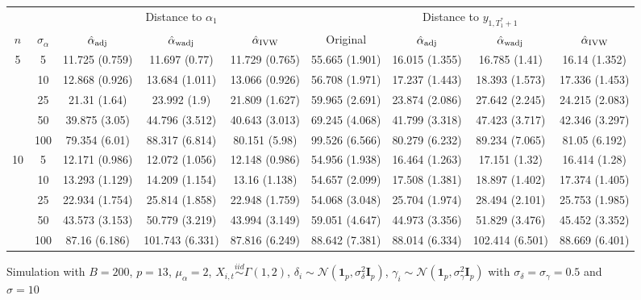 \documentclass[10pt]{article}
\newcommand{\simiid}{\stackrel{iid}{\sim}} %
\def\normal#1#2{\mathcal{N}(#1,#2)} %
\theoremstyle{definition}
\begin{document}

\begin{sidewaysfigure}
\centering
\caption{Simulation  with $B = 200$, $p = 13$, $\mu_{\alpha}=2$, $X_{i,t} \simiid \Gamma(1,2)$, $\delta_i \sim \normal{\mathbf{1}_p}{\sigma^2_{\delta}\mathbf{I}_p}$, $\gamma_i \sim \normal{\mathbf{1}_p}{\sigma^2_{\gamma}\mathbf{I}_p}$ with $\sigma_{\delta}=\sigma_{\gamma}=0.5$ and $\sigma = 10$}
\begin{tabular}{cc|ccc|cccc}
  & & \multicolumn{3}{c|}{Distance to $\alpha_1$}  & \multicolumn{4}{c}{Distance to $y_{1, T_1^*+1}$}  \\ 
  $n$   & $\sigma_{\alpha}$ & $\hat{\alpha}_{\rm adj}$  & $\hat{\alpha}_{\rm wadj}$ & $\hat{\alpha}_{\rm IVW}$ & Original & $\hat{\alpha}_{\rm adj}$ & $\hat{\alpha}_{\rm wadj}$ & $\hat{\alpha}_{\rm IVW}$\\[.3cm]  
  \hline
 \multirow{5}{*}{5} & 5  & 11.725 (0.759) & 11.697 (0.77) & 11.729 (0.765) & 55.665 (1.901) & 16.015 (1.355) & 16.785 (1.41) & 16.14 (1.352) \\ 
    & 10  & 12.868 (0.926) & 13.684 (1.011) & 13.066 (0.926) & 56.708 (1.971) & 17.237 (1.443) & 18.393 (1.573) & 17.336 (1.453) \\ 
    & 25  & 21.31 (1.64) & 23.992 (1.9) & 21.809 (1.627) & 59.965 (2.691) & 23.874 (2.086) & 27.642 (2.245) & 24.215 (2.083) \\ 
    & 50  & 39.875 (3.05) & 44.796 (3.512) & 40.643 (3.013) & 69.245 (4.068) & 41.799 (3.318) & 47.423 (3.717) & 42.346 (3.297) \\ 
    & 100  & 79.354 (6.01) & 88.317 (6.814) & 80.151 (5.98) & 99.526 (6.566) & 80.279 (6.232) & 89.234 (7.065) & 81.05 (6.192)\\[.3cm]  
   \multirow{5}{*}{10} & 5  & 12.171 (0.986) & 12.072 (1.056) & 12.148 (0.986) & 54.956 (1.938) & 16.464 (1.263) & 17.151 (1.32) & 16.414 (1.28) \\ 
    & 10  & 13.293 (1.129) & 14.209 (1.154) & 13.16 (1.138) & 54.657 (2.099) & 17.508 (1.381) & 18.897 (1.402) & 17.374 (1.405) \\ 
    & 25  & 22.934 (1.754) & 25.814 (1.858) & 22.948 (1.759) & 54.068 (3.048) & 25.704 (1.974) & 28.494 (2.101) & 25.753 (1.985) \\ 
    & 50  & 43.573 (3.153) & 50.779 (3.219) & 43.994 (3.149) & 59.051 (4.647) & 44.973 (3.356) & 51.829 (3.476) & 45.452 (3.352) \\ 
    & 100  & 87.16 (6.186) & 101.743 (6.331) & 87.816 (6.249) & 88.642 (7.381) & 88.014 (6.334) & 102.414 (6.501) & 88.669 (6.401) \\[.3cm]  

\end{tabular}
\end{sidewaysfigure}
\end{document}

